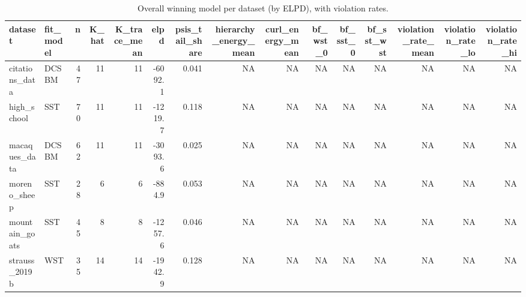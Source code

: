 \begin{table}

\caption{\label{tab:tab:overall_winners}Overall winning model per dataset (by ELPD), with violation rates.}
\centering
\begin{tabular}[t]{llrrrrrrrrrrrrr}
\toprule
dataset & fit\_model & n & K\_hat & K\_trace\_mean & elpd & psis\_tail\_share & hierarchy\_energy\_mean & curl\_energy\_mean & bf\_wst\_0 & bf\_sst\_0 & bf\_sst\_wst & violation\_rate\_mean & violation\_rate\_lo & violation\_rate\_hi\\
\midrule
citations\_data & DCSBM & 47 & 11 & 11 & -6092.1 & 0.041 & NA & NA & NA & NA & NA & NA & NA & NA\\
high\_school & SST & 70 & 11 & 11 & -1219.7 & 0.118 & NA & NA & NA & NA & NA & NA & NA & NA\\
macaques\_data & DCSBM & 62 & 11 & 11 & -3093.6 & 0.025 & NA & NA & NA & NA & NA & NA & NA & NA\\
moreno\_sheep & SST & 28 & 6 & 6 & -884.9 & 0.053 & NA & NA & NA & NA & NA & NA & NA & NA\\
mountain\_goats & SST & 45 & 8 & 8 & -1257.6 & 0.046 & NA & NA & NA & NA & NA & NA & NA & NA\\
\addlinespace
strauss\_2019b & WST & 35 & 14 & 14 & -1942.9 & 0.128 & NA & NA & NA & NA & NA & NA & NA & NA\\
\bottomrule
\end{tabular}
\end{table}
